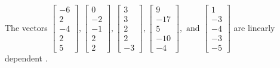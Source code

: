 \begin{exercise}
\begin{exerciseStatement}
  \end{exerciseStatement}
  \begin{exerciseAnswer}
   The vectors \(\left[\begin{array}{r}
-6 \\
2 \\
-4 \\
2 \\
5
\end{array}\right] , \left[\begin{array}{r}
0 \\
-2 \\
-1 \\
2 \\
2
\end{array}\right] , \left[\begin{array}{r}
3 \\
3 \\
2 \\
2 \\
-3
\end{array}\right] , \left[\begin{array}{r}
9 \\
-17 \\
5 \\
-10 \\
-4
\end{array}\right] , \text{ and } \left[\begin{array}{r}
1 \\
-3 \\
-4 \\
-3 \\
-5
\end{array}\right]\) are 
  	 linearly dependent  .
  


  \end{exerciseAnswer}
\end{exercise}